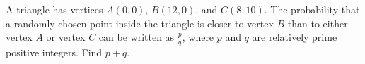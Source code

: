 A triangle has vertices $A(0,0)$,  $B(12,0)$,  and $C(8,10)$. The probability that a randomly chosen point inside the triangle is closer to vertex $B$ than to either vertex $A$ or vertex $C$ can be written as $\frac{p}{q}$,  where $p$ and $q$ are relatively prime positive integers. Find $p+q$.